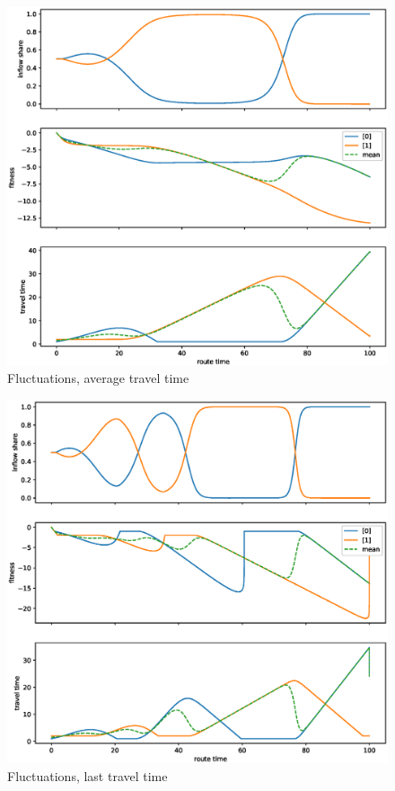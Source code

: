 \documentclass[12pt]{article}
\begin{document}
\begin{center}
	\begin{figure}
	\includegraphics[scale=0.5]{img/replicator_avg_tt.eps}
	\caption{Fluctuations, average travel time }
	\label{fig:fluctuations_avg}

	\end{figure}
	
\end{center}

\begin{center}
	\begin{figure}
	\includegraphics[scale=0.5]{img/replicator_last_tt.eps}
	\caption{Fluctuations, last travel time }
	\label{fig:fluctuations_last}

	\end{figure}
	
\end{center}
\end{document}
